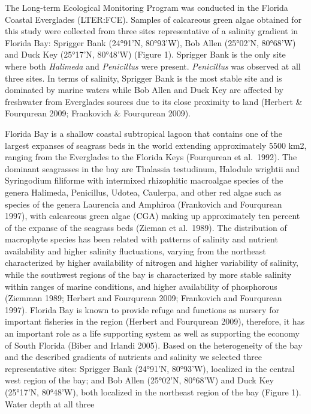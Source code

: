 \documentclass[]{article}
\begin{document}
The Long-term Ecological Monitoring Program was conducted in the Florida
Coastal Everglades (LTER:FCE). Samples of calcareous green algae
obtained for this study were collected from three sites representative
of a salinity gradient in Florida Bay: Sprigger Bank (24°91'N, 80°93'W),
Bob Allen (25°02'N, 80°68'W) and Duck Key (25°17'N, 80°48'W) (Figure 1).
Sprigger Bank is the only site where both \emph{Halimeda} and
\emph{Penicillus} were present. \emph{Penicillus} was observed at all
three sites. In terms of salinity, Sprigger Bank is the most stable site
and is dominated by marine waters while Bob Allen and Duck Key are
affected by freshwater from Everglades sources due to its close
proximity to land (Herbert \& Fourqurean 2009; Frankovich \& Fourqurean
2009).

Florida Bay is a shallow coastal subtropical lagoon that contains one of
the largest expanses of seagrass beds in the world extending
approximately 5500 km2, ranging from the Everglades to the Florida Keys
(Fourqurean et al.~1992). The dominant seagrasses in the bay are
Thalassia testudinum, Halodule wrightii and Syringodium filiforme with
intermixed rhizophitic macroalgae species of the genera Halimeda,
Penicillus, Udotea, Caulerpa, and other red algae such as species of the
genera Laurencia and Amphiroa (Frankovich and Fourqurean 1997), with
calcareous green algae (CGA) making up approximately ten percent of the
expanse of the seagrass beds (Zieman et al.~1989). The distribution of
macrophyte species has been related with patterns of salinity and
nutrient availability and higher salinity fluctuations, varying from the
northeast characterized by higher availability of nitrogen and higher
variability of salinity, while the southwest regions of the bay is
characterized by more stable salinity within ranges of marine
conditions, and higher availability of phosphorous (Ziemman 1989;
Herbert and Fourqurean 2009; Frankovich and Fourqurean 1997). Florida
Bay is known to provide refuge and functions as nursery for important
fisheries in the region (Herbert and Fourqurean 2009), therefore, it has
an important role as a life supporting system as well as supporting the
economy of South Florida (Biber and Irlandi 2005). Based on the
heterogeneity of the bay and the described gradients of nutrients and
salinity we selected three representative sites: Sprigger Bank (24°91'N,
80°93'W), localized in the central west region of the bay; and Bob Allen
(25°02'N, 80°68'W) and Duck Key (25°17'N, 80°48'W), both localized in
the northeast region of the bay (Figure 1). Water depth at all three
\end{document}
